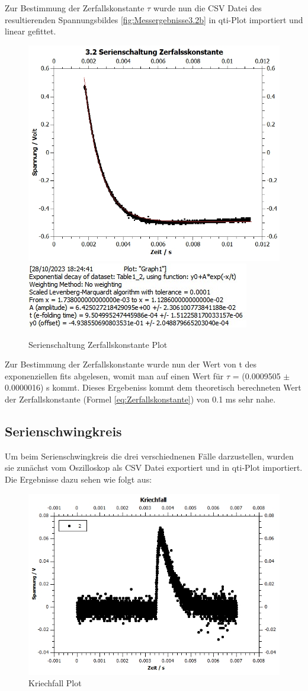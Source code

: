 \documentclass[12pt,a4paper,twoside]{article}
\begin{document}
\noindent
Zur Bestimmung der Zerfallskonstante $\tau$ wurde nun die CSV Datei des resultierenden Spannungsbildes \ref{fig:Messergebnisse3.2b} in qti-Plot importiert und linear gefittet.

\begin{figure}[H]
    \centering
    \includegraphics[width=0.6\linewidth, angle=0]{nudes/Zerfallskonstante Plot.jpg}
    \includegraphics[width=0.6\linewidth, angle=0]{nudes/Exponential Fit.jpg}
    \caption{Serienschaltung Zerfallskonstante Plot}
    \label{fig:SerienschaltungTauPlot}
\end{figure}

\noindent
Zur Bestimmung der Zerfallskonstante wurde nun der Wert von t des exponenziellen fits abgelesen, womit man auf einen Wert für $\tau$ = (0.0009505 $\pm$ 0.0000016) s kommt.
Dieses Ergebeniss kommt dem theoretisch berechneten Wert der Zerfallskonstante (Formel \ref{eq:Zerfallskonstante}) von 0.1 ms sehr nahe.


\subsection{Serienschwingkreis}

Um beim Serienschwingkreis die drei verschiednenen Fälle darzustellen, wurden sie zunächst vom Oszilloskop als CSV Datei exportiert und in qti-Plot importiert. Die Ergebnisse dazu sehen wie folgt aus:

\begin{figure}[H]
    \centering
    \includegraphics[width=0.6\linewidth, angle=0]{nudes/KriechfallPlot.jpg}
    \caption{Kriechfall Plot}
    \label{fig:KriechfallPlot}
\end{figure}
\end{document}
